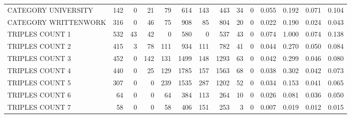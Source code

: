 \begin{tabular}{lrrrrrrrrrllll}
 CATEGORY UNIVERSITY      &             142 &             0 &              21 &              79 &             614 &  143 &  443 &   34 &    0 & 0.055 & 0.192 & 0.071 & 0.104 \\
 CATEGORY WRITTENWORK     &             316 &             0 &              46 &              75 &             908 &   85 &  804 &   20 &    0 & 0.022 & 0.190 & 0.024 & 0.043 \\
 TRIPLES COUNT 1          &             532 &            43 &              42 &               0 &             580 &    0 &  537 &   43 &    0 & 0.074 & 1.000 & 0.074 & 0.138 \\
 TRIPLES COUNT 2          &             415 &             3 &              78 &             111 &             934 &  111 &  782 &   41 &    0 & 0.044 & 0.270 & 0.050 & 0.084 \\
 TRIPLES COUNT 3          &             452 &             0 &             142 &             131 &            1499 &  148 & 1293 &   63 &    0 & 0.042 & 0.299 & 0.046 & 0.080 \\
 TRIPLES COUNT 4          &             440 &             0 &              25 &             129 &            1785 &  157 & 1563 &   68 &    0 & 0.038 & 0.302 & 0.042 & 0.073 \\
 TRIPLES COUNT 5          &             307 &             0 &               0 &             239 &            1535 &  287 & 1202 &   52 &    0 & 0.034 & 0.153 & 0.041 & 0.065 \\
 TRIPLES COUNT 6          &              64 &             0 &               0 &              64 &             384 &  113 &  264 &   10 &    0 & 0.026 & 0.081 & 0.036 & 0.050 \\
 TRIPLES COUNT 7          &              58 &             0 &               0 &              58 &             406 &  151 &  253 &    3 &    0 & 0.007 & 0.019 & 0.012 & 0.015 \\
\hline
\end{tabular}